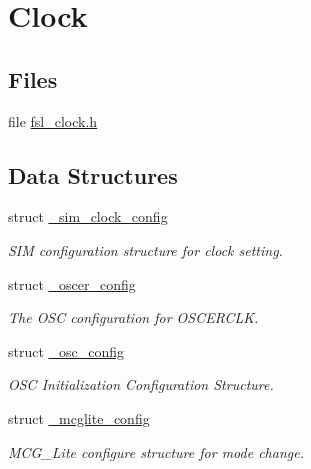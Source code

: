 \hypertarget{group__clock}{}\section{Clock}
\label{group__clock}
\subsection*{Files}
\begin{DoxyCompactItemize}
\item 
file \mbox{\hyperlink{fsl__clock_8h}{fsl\+\_\+clock.\+h}}
\end{DoxyCompactItemize}
\subsection*{Data Structures}
\begin{DoxyCompactItemize}
\item 
struct \mbox{\hyperlink{struct__sim__clock__config}{\+\_\+sim\+\_\+clock\+\_\+config}}
\begin{DoxyCompactList}\small\item\em S\+IM configuration structure for clock setting. \end{DoxyCompactList}\item 
struct \mbox{\hyperlink{struct__oscer__config}{\+\_\+oscer\+\_\+config}}
\begin{DoxyCompactList}\small\item\em The O\+SC configuration for O\+S\+C\+E\+R\+C\+LK. \end{DoxyCompactList}\item 
struct \mbox{\hyperlink{struct__osc__config}{\+\_\+osc\+\_\+config}}
\begin{DoxyCompactList}\small\item\em O\+SC Initialization Configuration Structure. \end{DoxyCompactList}\item 
struct \mbox{\hyperlink{struct__mcglite__config}{\+\_\+mcglite\+\_\+config}}
\begin{DoxyCompactList}\small\item\em M\+C\+G\+\_\+\+Lite configure structure for mode change. \end{DoxyCompactList}\end{DoxyCompactItemize}
